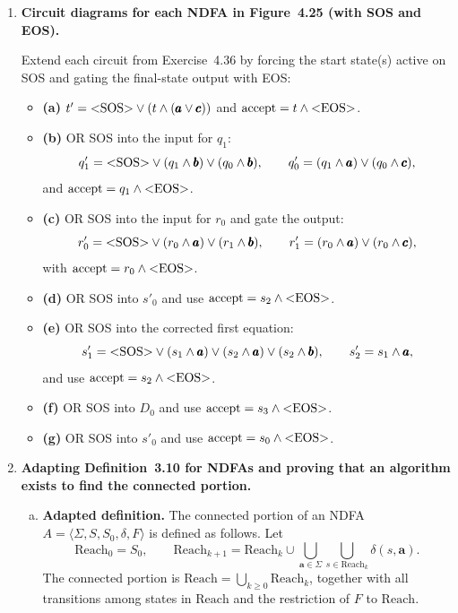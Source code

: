 \begin{enumerate}[{4.}1.]
\item \textbf{Circuit diagrams for each NDFA in Figure~4.25 (with SOS and EOS).}

Extend each circuit from Exercise~4.36 by forcing the start state(s) active on
\<SOS\> and gating the final-state output with \<EOS\>:
\begin{itemize}
  \item \textbf{(a)} $t'=\text{\text{\textless}SOS\text{\textgreater}}\vee(t\wedge(\pmb{a}\vee\pmb{c}))$ and
    $\text{accept}=t\wedge\text{\text{\textless}EOS\text{\textgreater}}$.
  \item \textbf{(b)} OR \<SOS\> into the input for $q_1$:
    \[
      q'_1=\text{\text{\textless}SOS\text{\textgreater}}\vee(q_1\wedge \pmb{b})\vee(q_0\wedge \pmb{b}),\qquad
      q'_0=(q_1\wedge \pmb{a})\vee(q_0\wedge \pmb{c}),
    \]
    and $\text{accept}=q_1\wedge\text{\text{\textless}EOS\text{\textgreater}}$.
  \item \textbf{(c)} OR \<SOS\> into the input for $r_0$ and gate the output:
    \[
      r'_0=\text{\text{\textless}SOS\text{\textgreater}}\vee(r_0\wedge \pmb{a})\vee(r_1\wedge \pmb{b}),\qquad
      r'_1=(r_0\wedge \pmb{a})\vee(r_0\wedge \pmb{c}),
    \]
    with $\text{accept}=r_0\wedge\text{\text{\textless}EOS\text{\textgreater}}$.
  \item \textbf{(d)} OR \<SOS\> into $s'_0$ and use
    $\text{accept}=s_2\wedge\text{\text{\textless}EOS\text{\textgreater}}$.
  \item \textbf{(e)} OR \<SOS\> into the corrected first equation:
    \[
      s'_1=\text{\text{\textless}SOS\text{\textgreater}}\vee(s_1\wedge \pmb{a})
        \vee(s_2\wedge \pmb{a})\vee(s_2\wedge \pmb{b}),
      \qquad
      s'_2=s_1\wedge \pmb{a},
    \]
    and use $\text{accept}=s_2\wedge\text{\text{\textless}EOS\text{\textgreater}}$.
  \item \textbf{(f)} OR \<SOS\> into $D_0$ and use
    $\text{accept}=s_3\wedge\text{\text{\textless}EOS\text{\textgreater}}$.
  \item \textbf{(g)} OR \<SOS\> into $s'_0$ and use
    $\text{accept}=s_0\wedge\text{\text{\textless}EOS\text{\textgreater}}$.
\end{itemize}

\item \textbf{Adapting Definition~3.10 for NDFAs and proving that an algorithm
exists to find the connected portion.}

\begin{enumerate}[(a)]
  \item \textbf{Adapted definition.}  The connected portion of an NDFA
  $A=\langle\Sigma,S,S_0,\delta,F\rangle$ is defined as follows.  Let
  \[
    \text{Reach}_0 = S_0,\qquad
    \text{Reach}_{k+1} = \text{Reach}_k
      \cup\bigcup_{\pmb{a}\in\Sigma}\bigcup_{s\in\text{Reach}_k}\delta(s,\pmb{a}).
  \]
  The connected portion is $\text{Reach}=\bigcup_{k\ge 0}\text{Reach}_k$, together
  with all transitions among states in $\text{Reach}$ and the restriction of
  $F$ to $\text{Reach}$.


\end{enumerate}
\end{enumerate}

